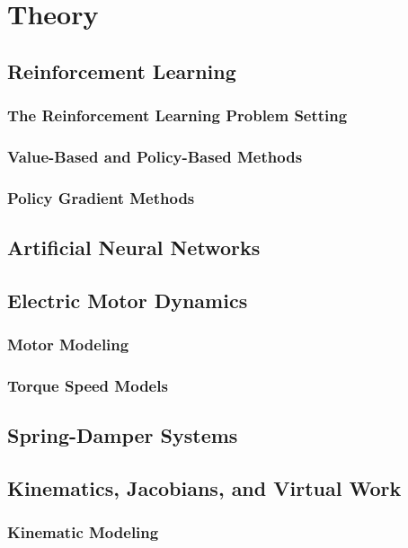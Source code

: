\section{Theory}

\subsection{Reinforcement Learning}
    \subsubsection{The Reinforcement Learning Problem Setting}
    \subsubsection{Value-Based and Policy-Based Methods}
    \subsubsection{Policy Gradient Methods}

\subsection{Artificial Neural Networks}

\subsection{Electric Motor Dynamics}
    \subsubsection{Motor Modeling}
    \subsubsection{Torque Speed Models}

\subsection{Spring-Damper Systems}

\subsection{Kinematics, Jacobians, and Virtual Work}
    \subsubsection{Kinematic Modeling}
